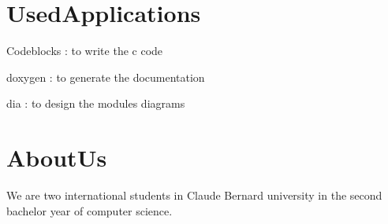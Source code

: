 \par
 \par
 \hypertarget{index_UsedApplications}{}\section{Used\-Applications}\label{index_UsedApplications}

\begin{DoxyItemize}
\item Codeblocks \-: to write the c code 
\item doxygen \-: to generate the documentation  
\item dia \-: to design the modules diagrams 
\end{DoxyItemize}\par
 \par
 \hypertarget{index_AboutUs}{}\section{About\-Us}\label{index_AboutUs}
We are two international students in Claude Bernard university in the second bachelor year of computer science. 

\par
 \par
